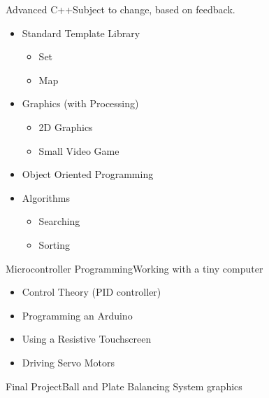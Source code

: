 \begin{frame}{Advanced C++}{Subject to change, based on feedback.}
\begin{itemize}
	\item Standard Template Library
	\begin{itemize}
		\item Set
        \item Map
	\end{itemize}
    \item Graphics (with Processing)
	\begin{itemize}
		\item 2D Graphics
        \item Small Video Game
	\end{itemize}
	\item Object Oriented Programming
	\item Algorithms
	\begin{itemize}
		\item Searching
        \item Sorting
	\end{itemize}
\end{itemize}
\end{frame}

\begin{frame}{Microcontroller Programming}{Working with a tiny computer}
\begin{itemize}
	\item Control Theory (PID controller)
	\item Programming an Arduino
	\item Using a Resistive Touchscreen
	\item Driving Servo Motors
\end{itemize}
\end{frame}

\begin{frame}{Final Project}{Ball and Plate Balancing System}
graphics
\end{frame}
